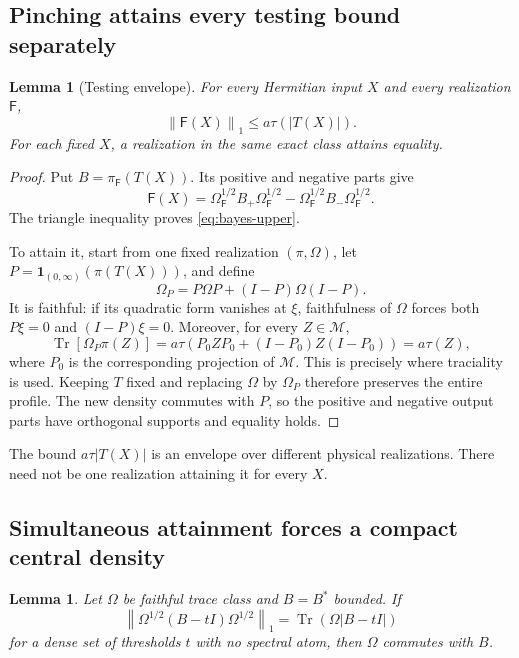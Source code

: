 \documentclass[11pt,reqno]{amsart}
\newtheorem{lemma}[theorem]{Lemma}
\theoremstyle{definition}
\theoremstyle{remark}
\numberwithin{equation}{section}
\DeclareMathOperator{\Tr}{Tr}
\newcommand{\M}{\mathcal M}
\newcommand{\F}{\mathsf F}
\newcommand{\one}{\mathbf 1}
\newcommand{\norm}[1]{\left\lVert#1\right\rVert}
\newcommand{\abs}[1]{\left\lvert#1\right\rvert}
\begin{document}
\subsection{Pinching attains every testing bound separately}

\begin{lemma}[Testing envelope]\label{lem:bayes-envelope}
For every Hermitian input $X$ and every realization $\F$,
\begin{equation}\label{eq:bayes-upper}
 \norm{\F(X)}_1\le a\tau(\abs{T(X)}).
\end{equation}
For each fixed $X$, a realization in the same exact class attains equality.
\end{lemma}

\begin{proof}
Put $B=\pi_\F(T(X))$. Its positive and negative parts give
\[
 \F(X)=\Omega_\F^{1/2}B_+\Omega_\F^{1/2}
       -\Omega_\F^{1/2}B_-\Omega_\F^{1/2}.
\]
The triangle inequality proves \eqref{eq:bayes-upper}.

To attain it, start from one fixed realization $(\pi,\Omega)$, let $P=\one_{(0,\infty)}(\pi(T(X)))$, and define
\begin{equation}\label{eq:pinched-density}
 \Omega_P=P\Omega P+(I-P)\Omega(I-P).
\end{equation}
It is faithful: if its quadratic form vanishes at $\xi$, faithfulness of $\Omega$ forces both $P\xi=0$ and $(I-P)\xi=0$. Moreover, for every $Z\in\M$,
\[
 \Tr[\Omega_P\pi(Z)]
 =a\tau(P_0 ZP_0+(I-P_0)Z(I-P_0))=a\tau(Z),
\]
where $P_0$ is the corresponding projection of $\M$. This is precisely where traciality is used. Keeping $T$ fixed and replacing $\Omega$ by $\Omega_P$ therefore preserves the entire profile. The new density commutes with $P$, so the positive and negative output parts have orthogonal supports and equality holds.
\end{proof}

The bound $a\tau|T(X)|$ is an envelope over different physical realizations. There need not be one realization attaining it for every $X$.

\subsection{Simultaneous attainment forces a compact central density}

\begin{lemma}\label{lem:equality-commutes}
Let $\Omega$ be faithful trace class and $B=B^*$ bounded. If
\[
 \norm{\Omega^{1/2}(B-tI)\Omega^{1/2}}_1
 =\Tr(\Omega\abs{B-tI})
\]
for a dense set of thresholds $t$ with no spectral atom, then $\Omega$ commutes with $B$.
\end{lemma}
\end{document}
